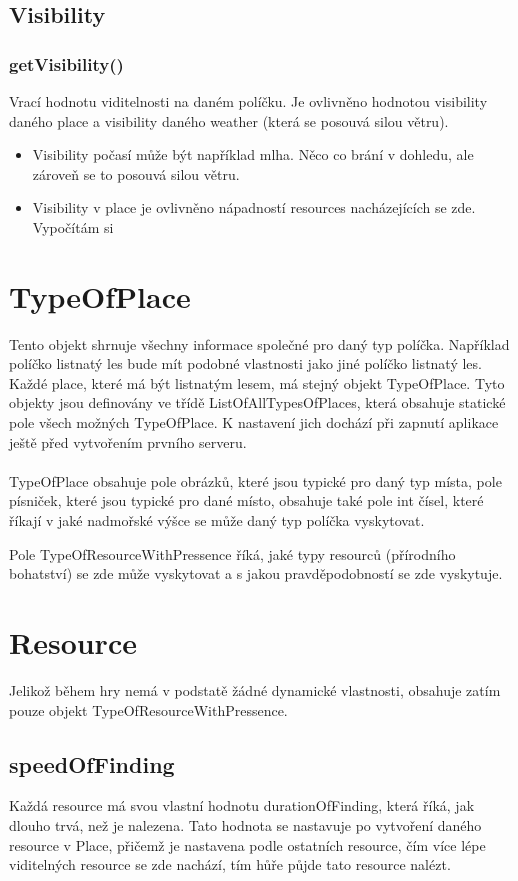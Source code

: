 \documentclass[12pt,a4paper]{report}
\begin{document}
\subsection{Visibility}
\subsubsection{getVisibility()}
Vrací hodnotu viditelnosti na daném políčku. Je ovlivněno hodnotou visibility daného place a visibility daného weather (která se posouvá silou větru).
\begin{itemize}
\item 
Visibility počasí může být například mlha. Něco co brání v dohledu, ale zároveň se to posouvá silou větru.
\item
Visibility v place je ovlivněno nápadností resources nacházejících se zde. Vypočítám si 
\end{itemize}
\section{TypeOfPlace}
Tento objekt shrnuje všechny informace společné pro daný typ políčka. Například políčko listnatý les bude mít podobné vlastnosti jako jiné políčko listnatý les. Každé place, které má být listnatým lesem, má stejný objekt TypeOfPlace. Tyto objekty jsou definovány ve třídě ListOfAllTypesOfPlaces, která obsahuje statické pole všech možných TypeOfPlace. K nastavení jich dochází při zapnutí aplikace ještě před vytvořením prvního serveru.

\paragraph{}
TypeOfPlace obsahuje pole obrázků, které jsou typické pro daný typ místa, pole písniček, které jsou typické pro dané místo, obsahuje také pole int čísel, které říkají v jaké nadmořské výšce se může daný typ políčka vyskytovat.

Pole TypeOfResourceWithPressence říká, jaké typy resourců (přírodního bohatství) se zde může vyskytovat a s jakou pravděpodobností se zde vyskytuje.

\section{Resource}
Jelikož během hry nemá v podstatě žádné dynamické vlastnosti, obsahuje zatím pouze objekt TypeOfResourceWithPressence. 

\subsection{speedOfFinding}
Každá resource má svou vlastní hodnotu durationOfFinding, která říká, jak dlouho trvá, než je nalezena. Tato hodnota se nastavuje po vytvoření daného resource v Place, přičemž je nastavena podle ostatních resource, čím více lépe viditelných resource se zde nachází, tím hůře půjde tato resource nalézt.
\end{document}
